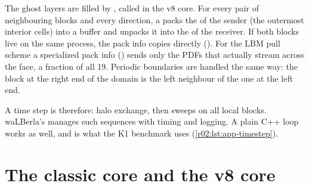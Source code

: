 The ghost layers are filled by , called  in the
v8 core. For every pair of neighbouring blocks and every direction, a 
packs the  of the sender (the outermost interior cells) into a buffer
and unpacks it into the  of the receiver. If both blocks live on the
same process, the pack info copies directly (). For the LBM pull scheme a
specialized pack info () sends only the PDFs that actually stream
across the face, a fraction of all 19. Periodic boundaries are handled the same way:
the block at the right end of the domain is the left neighbour of the one at the left
end.

A time step is therefore: halo exchange, then sweeps on all local blocks. waLBerla's
 manages such sequences with timing and logging. A plain C++ loop
works as well, and is what the K1 benchmark uses (\cref{r02:lst:app-timestep}).

\section{The classic core and the v8 core}\label{r02:sec:v8}

